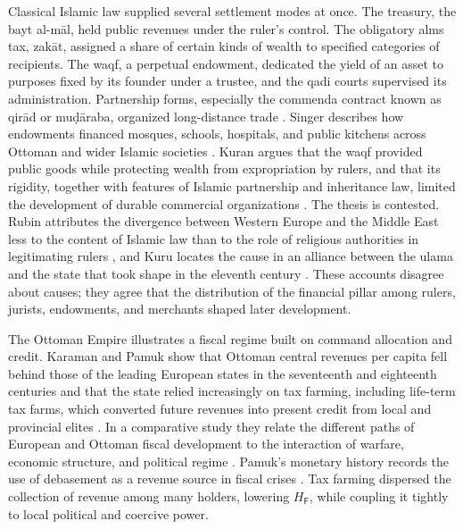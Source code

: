 \documentclass[11pt,letterpaper]{article}
\theoremstyle{definition}
\theoremstyle{remark}
\newcommand{\pF}{\mathsf{F}}
\begin{document}
Classical Islamic law supplied several settlement modes at once. The treasury, the bayt al-m\=al, held public revenues under the ruler's control. The obligatory alms tax, zak\=at, assigned a share of certain kinds of wealth to specified categories of recipients. The waqf, a perpetual endowment, dedicated the yield of an asset to purposes fixed by its founder under a trustee, and the qadi courts supervised its administration. Partnership forms, especially the commenda contract known as qir\=ad or mu\d{d}\=araba, organized long-distance trade \citep{udovitch1970,cizakca1996}. Singer describes how endowments financed mosques, schools, hospitals, and public kitchens across Ottoman and wider Islamic societies \citep{singer2008}. Kuran argues that the waqf provided public goods while protecting wealth from expropriation by rulers, and that its rigidity, together with features of Islamic partnership and inheritance law, limited the development of durable commercial organizations \citep{kuran2001,kuran2004,kuran2011}. The thesis is contested. Rubin attributes the divergence between Western Europe and the Middle East less to the content of Islamic law than to the role of religious authorities in legitimating rulers \citep{rubin2017}, and Kuru locates the cause in an alliance between the ulama and the state that took shape in the eleventh century \citep{kuru2019}. These accounts disagree about causes; they agree that the distribution of the financial pillar among rulers, jurists, endowments, and merchants shaped later development.

The Ottoman Empire illustrates a fiscal regime built on command allocation and credit. Karaman and Pamuk show that Ottoman central revenues per capita fell behind those of the leading European states in the seventeenth and eighteenth centuries and that the state relied increasingly on tax farming, including life-term tax farms, which converted future revenues into present credit from local and provincial elites \citep{karaman2010}. In a comparative study they relate the different paths of European and Ottoman fiscal development to the interaction of warfare, economic structure, and political regime \citep{karaman2013}. Pamuk's monetary history records the use of debasement as a revenue source in fiscal crises \citep{pamuk2000}. Tax farming dispersed the collection of revenue among many holders, lowering $H_{\pF}$, while coupling it tightly to local political and coercive power.
\end{document}
